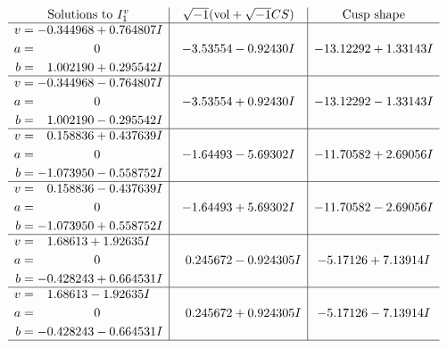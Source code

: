 \documentclass[1p]{elsarticle_modified}
\theoremstyle{definition}
\newcommand{\I}{\sqrt{-1}}
\begin{document}
$$\begin{array}{c|c|c}  
\text{Solutions to }I^v_{1}& \I (\text{vol} + \sqrt{-1}CS) & \text{Cusp shape}\\
 \hline 
\begin{aligned}
v &= -0.344968 + 0.764807 I \\
a &= \phantom{-0.000000 } 0 \\
b &= \phantom{-}1.002190 + 0.295542 I\end{aligned}
 & -3.53554 - 0.92430 I & -13.12292 + 1.33143 I \\ \hline\begin{aligned}
v &= -0.344968 - 0.764807 I \\
a &= \phantom{-0.000000 } 0 \\
b &= \phantom{-}1.002190 - 0.295542 I\end{aligned}
 & -3.53554 + 0.92430 I & -13.12292 - 1.33143 I \\ \hline\begin{aligned}
v &= \phantom{-}0.158836 + 0.437639 I \\
a &= \phantom{-0.000000 } 0 \\
b &= -1.073950 - 0.558752 I\end{aligned}
 & -1.64493 - 5.69302 I & -11.70582 + 2.69056 I \\ \hline\begin{aligned}
v &= \phantom{-}0.158836 - 0.437639 I \\
a &= \phantom{-0.000000 } 0 \\
b &= -1.073950 + 0.558752 I\end{aligned}
 & -1.64493 + 5.69302 I & -11.70582 - 2.69056 I \\ \hline\begin{aligned}
v &= \phantom{-}1.68613 + 1.92635 I \\
a &= \phantom{-0.000000 } 0 \\
b &= -0.428243 + 0.664531 I\end{aligned}
 & \phantom{-}0.245672 - 0.924305 I & -5.17126 + 7.13914 I \\ \hline\begin{aligned}
v &= \phantom{-}1.68613 - 1.92635 I \\
a &= \phantom{-0.000000 } 0 \\
b &= -0.428243 - 0.664531 I\end{aligned}
 & \phantom{-}0.245672 + 0.924305 I & -5.17126 - 7.13914 I\\
 \hline 
 \end{array}$$\newpage
\newpage\renewcommand{\arraystretch}{1}
\end{document}
